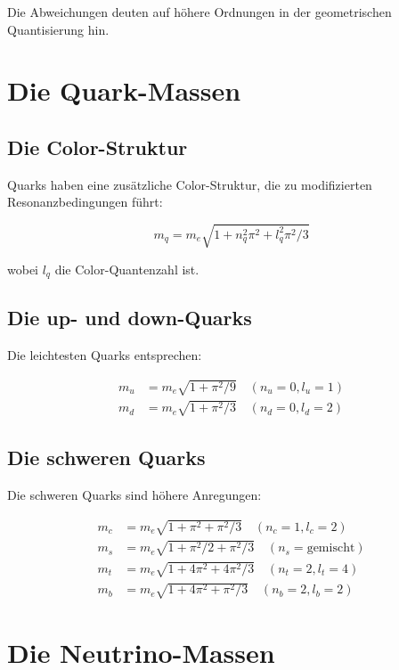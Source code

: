 \documentclass[12pt,a4paper]{report}
\begin{document}
	Die Abweichungen deuten auf höhere Ordnungen in der geometrischen Quantisierung hin.
	
	\section{Die Quark-Massen}
	
	\subsection{Die Color-Struktur}
	
	Quarks haben eine zusätzliche Color-Struktur, die zu modifizierten Resonanzbedingungen führt:
	
	\begin{equation}
		m_q = m_e \sqrt{1 + n_q^2\pi^2 + l_q^2\pi^2/3}
	\end{equation}
	
	wobei $l_q$ die Color-Quantenzahl ist.
	
	\subsection{Die up- und down-Quarks}
	
	Die leichtesten Quarks entsprechen:
	
	\begin{align}
		m_u &= m_e \sqrt{1 + \pi^2/9} \quad (n_u = 0, l_u = 1) \\
		m_d &= m_e \sqrt{1 + \pi^2/3} \quad (n_d = 0, l_d = 2)
	\end{align}
	
	\subsection{Die schweren Quarks}
	
	Die schweren Quarks sind höhere Anregungen:
	
	\begin{align}
		m_c &= m_e \sqrt{1 + \pi^2 + \pi^2/3} \quad (n_c = 1, l_c = 2) \\
		m_s &= m_e \sqrt{1 + \pi^2/2 + \pi^2/3} \quad (n_s = \text{gemischt}) \\
		m_t &= m_e \sqrt{1 + 4\pi^2 + 4\pi^2/3} \quad (n_t = 2, l_t = 4) \\
		m_b &= m_e \sqrt{1 + 4\pi^2 + \pi^2/3} \quad (n_b = 2, l_b = 2)
	\end{align}
	
	\section{Die Neutrino-Massen}
	
\end{document}
